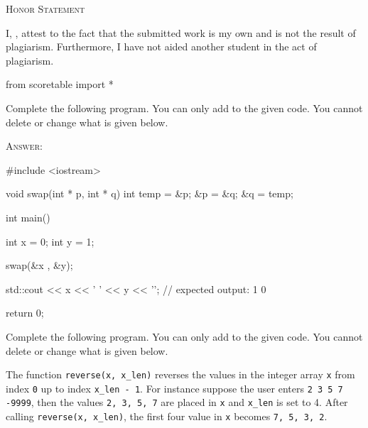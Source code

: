 

\renewcommand\AUTHOR{cadalebout1@cougars.ccis.edu} %


\topmattertwo



\begin{center}
  \textsc{Honor Statement}
\end{center}
I, ,
attest to the fact that the submitted work is my own and
is not the result of plagiarism.
Furthermore, I have not aided another student in the act of
plagiarism.

\begin{python}
from scoretable import *
\end{python}
        
\newpage
\nextq
Complete the following program. You can only add to the given code.
You cannot delete or change what is given below.

\textsc{Answer:}
\begin{answercode}
#include <iostream>

void swap(int * p, int * q)
{
        int  temp = &p;
        &p = &q;
        &q = temp;
}


int main()
{
    int x = 0;
    int y = 1;

    swap(&x , &y);
    
    std::cout << x << ' ' << y << '\n'; // expected output: 1 0
    
    return 0;
}
\end{answercode}

\newpage
\nextq
Complete the following program.
You can only add to the given code. 
You cannot delete or change what is given below.

The function \verb!reverse(x, x_len)! reverses the values in the integer
array \verb!x!
from index \verb!0! up to index \verb!x_len - 1!.
For instance suppose the user enters \verb!2 3 5 7 -9999!, then
the values \verb!2, 3, 5, 7! are placed in \verb!x!
and \verb!x_len! is set to 4.
After calling \verb!reverse(x, x_len)!,
the first four value in \verb!x! becomes \verb!7, 5, 3, 2!.

